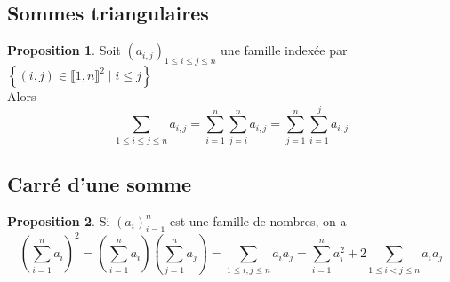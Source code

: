 \documentclass[10pt,a4paper]{article}
\theoremstyle{definition}
\newtheorem{proposition}{Proposition}[section]
\begin{document}
\subsection{Sommes triangulaires}
\begin{proposition}
Soit $(a_{i, j})_{1 \leq i \leq j \leq n}$ une famille indexée par $\left\{ (i, j) \in \llbracket 1, n \rrbracket^2 \mid i \leq j \right\}$ \\
Alors
\[ \sum_{1 \leq i \leq j \leq n} a_{i, j} = \sum_{i = 1}^n \sum_{j = i}^n a_{i, j} = \sum_{j = 1}^n \sum_{i = 1}^j a_{i, j} \]
\end{proposition}

\subsection{Carré d'une somme}
\begin{proposition}
Si $(a_i)_{i = 1}^n$ est une famille de nombres, on a
\[ \left( \sum_{i = 1}^n a_i \right)^2 = \left(\sum_{i = 1}^n a_i \right) \left( \sum_{j = 1}^n a_j \right) = \sum_{1 \leq i, j \leq n} a_i a_j = \sum_{i = 1}^n a_i^2 + 2\sum_{1 \leq i < j \leq n} a_i a_j \]
\end{proposition}
\end{document}
